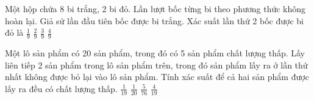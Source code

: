 \begin{ex}%
    Một hộp chứa 8 bi trắng, 2 bi đỏ. Lần lượt bốc từng bi theo phương thức không hoàn lại. Giả sử lần đầu tiên bốc được bi trắng. Xác suất lần thứ 2 bốc được bi đỏ là
    \choice
    {$\frac{1}{9}$}
    {\True $\frac{2}{9}$}
    {$\frac{3}{9}$}
    {$\frac{4}{9}$}
\end{ex}
\begin{ex}%
    Một lô sản phẩm có 20 sản phẩm, trong đó có 5 sản phẩm chất lượng thấp. Lấy liên tiếp 2 sản phẩm trong lô sản phẩm trên, trong đó sản phẩm lấy ra ở lần thứ nhất không được bỏ lại vào lô sản phẩm. Tính xác suất để cả hai sản phẩm được lấy ra đều có chất lượng thấp.
    \choice
    {\True $\frac{1}{19}$}
    {$\frac{1}{20}$}
    {$\frac{5}{76}$}
    {$\frac{4}{19}$}
\end{ex}

